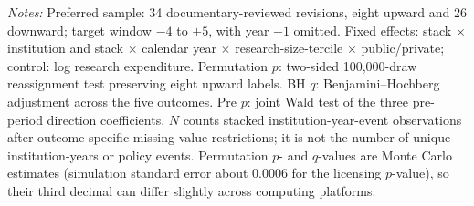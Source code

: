 \begin{table}[htbp]\centering
\caption{Technology-transfer outcomes around IP-policy revisions}\label{tab:main}
\begin{threeparttable}\footnotesize
{}
\begin{tablenotes}[flushleft]\footnotesize
\item \textit{Notes:} Preferred sample: 34 documentary-reviewed revisions, eight upward and 26 downward; target window $-4$ to $+5$, with year $-1$ omitted. Fixed effects: stack $\times$ institution and stack $\times$ calendar year $\times$ research-size-tercile $\times$ public/private; control: log research expenditure. Permutation $p$: two-sided 100,000-draw reassignment test preserving eight upward labels. BH $q$: Benjamini--Hochberg adjustment across the five outcomes. Pre $p$: joint Wald test of the three pre-period direction coefficients. $N$ counts stacked institution-year-event observations after outcome-specific missing-value restrictions; it is not the number of unique institution-years or policy events. Permutation $p$- and $q$-values are Monte Carlo estimates (simulation standard error about 0.0006 for the licensing $p$-value), so their third decimal can differ slightly across computing platforms.
\end{tablenotes}
\end{threeparttable}
\end{table}


